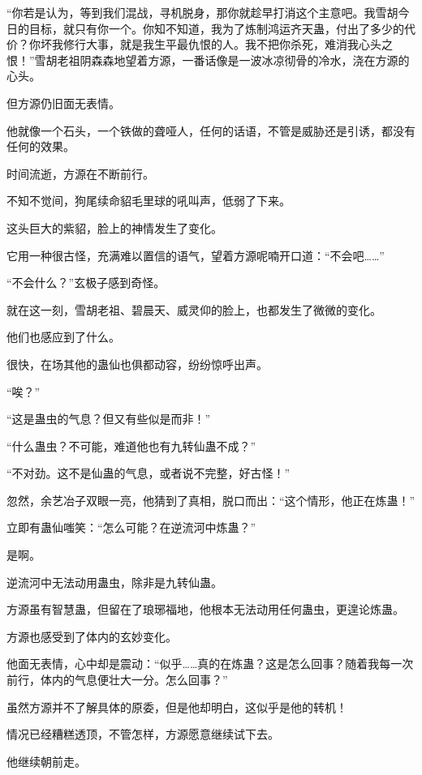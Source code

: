 
\begin{this_body}

“你若是认为，等到我们混战，寻机脱身，那你就趁早打消这个主意吧。我雪胡今日的目标，就只有你一个。你知不知道，我为了炼制鸿运齐天蛊，付出了多少的代价？你坏我修行大事，就是我生平最仇恨的人。我不把你杀死，难消我心头之恨！”雪胡老祖阴森森地望着方源，一番话像是一波冰凉彻骨的冷水，浇在方源的心头。

但方源仍旧面无表情。

他就像一个石头，一个铁做的聋哑人，任何的话语，不管是威胁还是引诱，都没有任何的效果。

时间流逝，方源在不断前行。

不知不觉间，狗尾续命貂毛里球的吼叫声，低弱了下来。

这头巨大的紫貂，脸上的神情发生了变化。

它用一种很古怪，充满难以置信的语气，望着方源呢喃开口道：“不会吧……”

“不会什么？”玄极子感到奇怪。

就在这一刻，雪胡老祖、碧晨天、威灵仰的脸上，也都发生了微微的变化。

他们也感应到了什么。

很快，在场其他的蛊仙也俱都动容，纷纷惊呼出声。

“唉？”

“这是蛊虫的气息？但又有些似是而非！”

“什么蛊虫？不可能，难道他也有九转仙蛊不成？”

“不对劲。这不是仙蛊的气息，或者说不完整，好古怪！”

忽然，余艺冶子双眼一亮，他猜到了真相，脱口而出：“这个情形，他正在炼蛊！”

立即有蛊仙嗤笑：“怎么可能？在逆流河中炼蛊？”

是啊。

逆流河中无法动用蛊虫，除非是九转仙蛊。

方源虽有智慧蛊，但留在了琅琊福地，他根本无法动用任何蛊虫，更遑论炼蛊。

方源也感受到了体内的玄妙变化。

他面无表情，心中却是震动：“似乎……真的在炼蛊？这是怎么回事？随着我每一次前行，体内的气息便壮大一分。怎么回事？”

虽然方源并不了解具体的原委，但是他却明白，这似乎是他的转机！

情况已经糟糕透顶，不管怎样，方源愿意继续试下去。

他继续朝前走。


\end{this_body}
